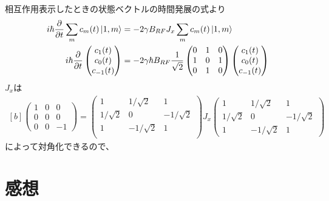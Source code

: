 \documentclass[../ap_2012.tex]{subfiles}
\begin{document}
\section{}
相互作用表示したときの状態ベクトルの時間発展の式より
\begin{equation}\begin{aligned}[b]
    i\hbar\pdv{t}\sum_m c_m(t) \ket{1,m}&=-2\gamma B_{RF}J_x\sum_m c_m(t) \ket{1,m}\\
    i\hbar\pdv{t}\begin{pmatrix}
        {c_1(t)}\\
        {c_0(t)}\\
        {c_{-1}(t)}
    \end{pmatrix}
    &=-2\gamma \hbar B_{RF}\frac{1}{\sqrt{2}}\begin{pmatrix}
        0 & 1 & 0\\
        1 & 0 & 1\\
        0 & 1 & 0
    \end{pmatrix}
    \begin{pmatrix}
        {c_1(t)}\\
        {c_0(t)}\\
        {c_{-1}(t)}
    \end{pmatrix}
\end{aligned}\end{equation}
\(J_x\)は
\begin{equation}\begin{aligned}[b]
    \begin{pmatrix}
        1 & 0 & 0\\
        0 & 0 & 0\\
        0 & 0 & -1
    \end{pmatrix}
    =\begin{pmatrix}
        1 & 1/\sqrt{2} & 1\\
        1/\sqrt{2} & 0 & -1/\sqrt{2}\\
        1 & -1/\sqrt{2} & 1\\
    \end{pmatrix}
    J_x\begin{pmatrix}
        1 & 1/\sqrt{2} & 1\\
        1/\sqrt{2} & 0 & -1/\sqrt{2}\\
        1 & -1/\sqrt{2} & 1
    \end{pmatrix}
\end{aligned}\end{equation}
によって対角化できるので、

\section*{感想}
\end{document}
